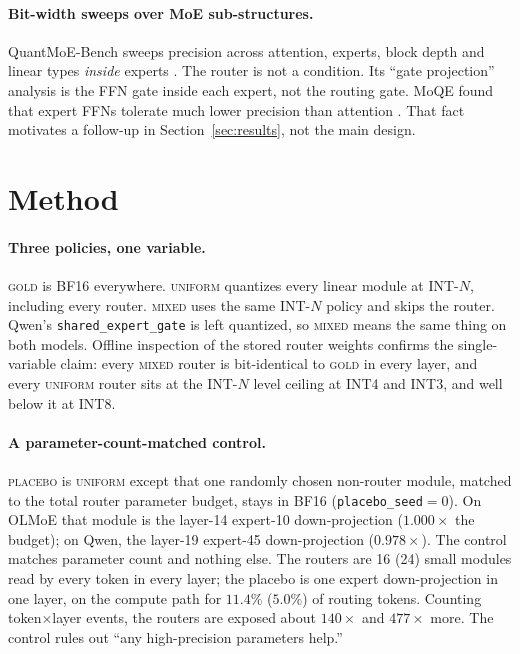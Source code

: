 \documentclass[11pt]{article}
\newcommand{\gold}{\textsc{gold}}
\newcommand{\uniform}{\textsc{uniform}}
\newcommand{\mixed}{\textsc{mixed}}
\newcommand{\placebo}{\textsc{placebo}}
\begin{document}
\paragraph{Bit-width sweeps over MoE sub-structures.}
QuantMoE-Bench sweeps precision across attention, experts, block depth and
linear types \emph{inside} experts \citep{li2024quantmoebench}. The router
is not a condition. Its ``gate projection'' analysis is the FFN gate inside
each expert, not the routing gate. MoQE found that expert FFNs tolerate
much lower precision than attention \citep{kim2023moqe}. That fact
motivates a follow-up in Section~\ref{sec:results}, not the main design.

\section{Method}
\label{sec:method}

\paragraph{Three policies, one variable.}
\gold{} is BF16 everywhere. \uniform{} quantizes every linear module at
INT-$N$, including every router. \mixed{} uses the same INT-$N$ policy and
skips the router. Qwen's
\texttt{shared\_expert\_gate} is left quantized, so \mixed{} means the same
thing on both models. Offline inspection of the stored router weights
confirms the single-variable claim: every \mixed{} router is bit-identical
to \gold{} in every layer, and every \uniform{} router sits at the INT-$N$
level ceiling at INT4 and INT3, and well below it at INT8.

\paragraph{A parameter-count-matched control.}
\placebo{} is \uniform{} except that one randomly chosen non-router module,
matched to the total router parameter budget, stays in BF16
(\texttt{placebo\_seed}${=}0$). On OLMoE that module is the layer-14
expert-10 down-projection ($1.000\times$ the budget); on Qwen, the
layer-19 expert-45 down-projection ($0.978\times$). The
control matches parameter count and nothing else. The routers are 16 (24)
small modules read by every token in every layer; the placebo is one expert
down-projection in one layer, on the compute path for $11.4\%$ ($5.0\%$) of
routing tokens. Counting token$\times$layer events, the routers are
exposed about $140\times$ and $477\times$ more. The control rules out
``any high-precision parameters help.''
\end{document}
